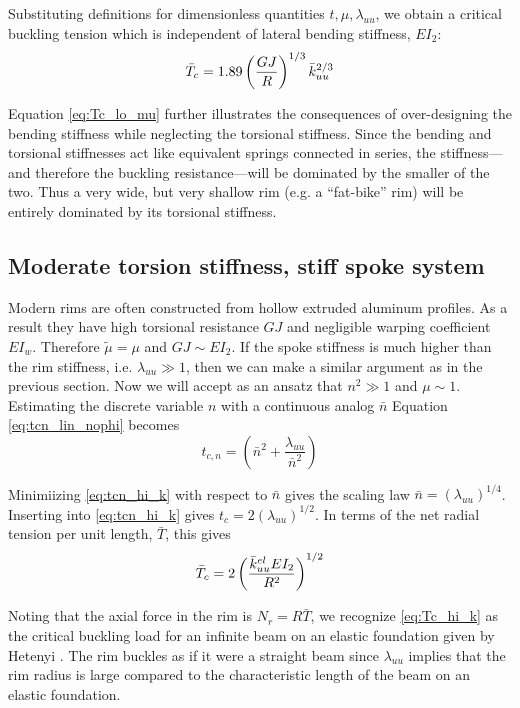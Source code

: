 \documentclass[\rootdir/thesis.tex]{subfiles}
\begin{document}
Substituting definitions for dimensionless quantities $t,\mu,\lambda_{uu}$, we obtain a critical buckling tension which is independent of lateral bending stiffness, $EI_2$:
\begin{equation}
\label{eq:Tc_lo_mu}
\bar{T}_c = 1.89 \left( \frac{GJ}{R} \right)^{1/3} \bar{k}_{uu}^{2/3}
\end{equation}

Equation \eqref{eq:Tc_lo_mu} further illustrates the consequences of over-designing the bending stiffness while neglecting the torsional stiffness. Since the bending and torsional stiffnesses act like equivalent springs connected in series, the stiffness---and therefore the buckling resistance---will be dominated by the smaller of the two. Thus a very wide, but very shallow rim (e.g. a ``fat-bike'' rim) will be entirely dominated by its torsional stiffness.

\subsection{Moderate torsion stiffness, stiff spoke system}
Modern rims are often constructed from hollow extruded aluminum profiles. As a result they have high torsional resistance $GJ$ and negligible warping coefficient $EI_w$. Therefore $\tilde{\mu} = \mu$ and $GJ \sim EI_2$. If the spoke stiffness is much higher than the rim stiffness, i.e. $\lambda_{uu} \gg 1$, then we can make a similar argument as in the previous section. Now we will accept as an ansatz that $n^2 \gg 1$ and $\mu \sim 1$. Estimating the discrete variable $n$ with a continuous analog $\bar{n}$ Equation \eqref{eq:tcn_lin_nophi} becomes
\begin{equation}
\label{eq:tcn_hi_k}
t_{c,n} = \left(\bar{n}^2 + \frac{\lambda_{uu}}{\bar{n}^2}\right)
\end{equation}

Minimiizing \eqref{eq:tcn_hi_k} with respect to $\bar{n}$ gives the scaling law $\bar{n}=(\lambda_{uu})^{1/4}$. Inserting into \eqref{eq:tcn_hi_k} gives $t_c = 2(\lambda_{uu})^{1/2}$. In terms of the net radial tension per unit length, $\bar{T}$, this gives
\begin{equation}
\label{eq:Tc_hi_k}
\bar{T}_c = 2 \left(\frac{\bar{k}_{uu}^{el}EI_2}{R^2}\right)^{1/2}
\end{equation}

Noting that the axial force in the rim is $N_r=R\bar{T}$, we recognize \eqref{eq:Tc_hi_k} as the critical buckling load for an infinite beam on an elastic foundation given by Hetenyi \cite{Hetenyi1946}. The rim buckles as if it were a straight beam since $\lambda_{uu}$ implies that the rim radius is large compared to the characteristic length of the beam on an elastic foundation.
\end{document}
